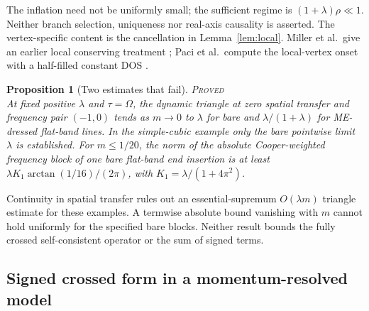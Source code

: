 \documentclass[11pt]{article}
\newcommand{\PROVED}{\upshape\mdseries\textsc{Proved}}
\newtheorem{proposition}[theorem]{Proposition}
\theoremstyle{definition}
\theoremstyle{remark}
\begin{document}
The inflation need not be uniformly small; the sufficient regime is $(1+\lambda)\rho\ll1$. Neither branch selection, uniqueness nor real-axis causality is asserted. The vertex-specific content is the cancellation in Lemma~\ref{lem:local}. Miller et al.\ give an earlier local conserving treatment \cite{Miller}; Paci et al.\ compute the local-vertex onset with a half-filled constant DOS \cite{Paci}.

\begin{proposition}[Two estimates that fail]\label{prop:obstruction}\hfill\PROVED\\
At fixed positive $\lambda$ and $\tau=\Omega$, the dynamic triangle at zero spatial transfer and frequency pair $(-1,0)$ tends as $m\to0$ to $\lambda$ for bare and $\lambda/(1+\lambda)$ for ME-dressed flat-band lines. In the simple-cubic example only the bare pointwise limit $\lambda$ is established. For $m\le1/20$, the norm of the absolute Cooper-weighted frequency block of one bare flat-band end insertion is at least $\lambda K_1\arctan(1/16)/(2\pi)$, with $K_1=\lambda/(1+4\pi^2)$.
\end{proposition}

Continuity in spatial transfer rules out an essential-supremum $O(\lambda m)$ triangle estimate for these examples. A termwise absolute bound vanishing with $m$ cannot hold uniformly for the specified bare blocks. Neither result bounds the fully crossed self-consistent operator or the sum of signed terms.

\subsection{Signed crossed form in a momentum-resolved model}
\end{document}
